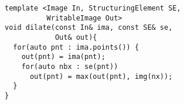 \documentclass[varwidth=8cm, border={0.1cm 0.1cm 0.1cm 0.1cm}]{standalone}
\begin{document}
\begin{verbatim}
template <Image In, StructuringElement SE,
          WritableImage Out>
void dilate(const In& ima, const SE& se,
            Out& out){
  for(auto pnt : ima.points()) {
    out(pnt) = ima(pnt);
    for(auto nbx : se(pnt))
      out(pnt) = max(out(pnt), img(nx));
  }
}
\end{verbatim}
\end{document}
